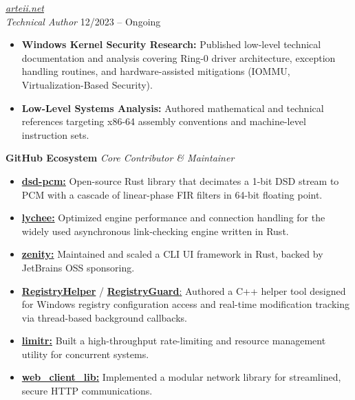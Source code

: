 \documentclass[10pt,a4paper]{article}
\newcommand{\experienceitem}[4]{
  \vspace{12pt}
  \noindent{\large\textbf{\color{sectioncolor}#1}} \hfill \textit{#2} \\
  \noindent\textit{#3} \hfill #4 \par %
  \vspace{2pt}
}
\begin{document}
\experienceitem{Systems \& Security Research Platform}{\href{https://arteii.net}{arteii.net}}{Technical Author}{12/2023 -- Ongoing}
\begin{itemize}[leftmargin=1.5em, nosep]
    \item \textbf{Windows Kernel Security Research:} Published low-level technical documentation and analysis covering Ring-0 driver architecture, exception handling routines, and hardware-assisted mitigations (IOMMU, Virtualization-Based Security).
    \item \textbf{Low-Level Systems Analysis:} Authored mathematical and technical references targeting x86-64 assembly conventions and machine-level instruction sets.
\end{itemize}

\vspace{5pt}
\noindent\textbf{GitHub Ecosystem} \hfill \textit{Core Contributor \& Maintainer}
\begin{itemize}[leftmargin=1.5em, nosep]
    \item \href{https://github.com/otoya-studio/dsd-pcm}{\textbf{dsd-pcm:}} Open-source Rust library that decimates a 1-bit DSD stream to PCM with a cascade of linear-phase FIR filters in 64-bit floating point.
    \item \href{https://github.com/lycheeverse/lychee}{\textbf{lychee:}} Optimized engine performance and connection handling for the widely used asynchronous link-checking engine written in Rust.
    \item \href{https://github.com/arteiii/zenity}{\textbf{zenity:}} Maintained and scaled a CLI UI framework in Rust, backed by JetBrains OSS sponsoring.
    \item \href{https://github.com/Arteiii/RegistryHelper}{\textbf{RegistryHelper}} / \href{https://github.com/Arteiii/RegistryGuard}{\textbf{RegistryGuard}:} Authored a C++ helper tool designed for Windows registry configuration access and real-time modification tracking via thread-based background callbacks.
    \item \href{https://github.com/Arteiii/limitr}{\textbf{limitr:}} Built a high-throughput rate-limiting and resource management utility for concurrent systems.
    \item \href{https://github.com/Arteiii/web_client_lib}{\textbf{web\_client\_lib:}} Implemented a modular network library for streamlined, secure HTTP communications.
\end{itemize}
\end{document}
